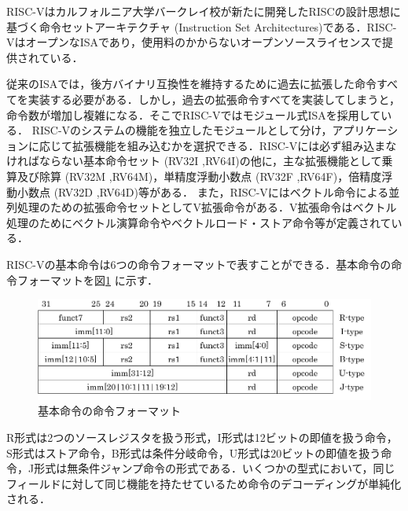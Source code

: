 
RISC-Vはカルフォルニア大学バークレイ校が新たに開発したRISCの設計思想に基づく命令セットアーキテクチャ (Instruction Set Architectures)である．RISC-VはオープンなISAであり，使用料のかからないオープンソースライセンスで提供されている．

従来のISAでは，後方バイナリ互換性を維持するために過去に拡張した命令すべてを実装する必要がある．しかし，過去の拡張命令すべてを実装してしまうと，命令数が増加し複雑になる．そこでRISC-Vではモジュール式ISAを採用している\cite{bib:risc-v-module}．
RISC-Vのシステムの機能を独立したモジュールとして分け，アプリケーションに応じて拡張機能を組み込むかを選択できる．RISC-Vには必ず組み込まなければならない基本命令セット (RV32I ,RV64I)の他に，主な拡張機能として乗算及び除算 (RV32M ,RV64M)，単精度浮動小数点 (RV32F ,RV64F)，倍精度浮動小数点 (RV32D ,RV64D)等がある．
また，RISC-Vにはベクトル命令による並列処理のための拡張命令セットとしてV拡張命令がある．V拡張命令はベクトル処理のためにベクトル演算命令やベクトルロード・ストア命令等が定義されている．

RISC-Vの基本命令は6つの命令フォーマットで表すことができる．基本命令の命令フォーマットを図\ref{fig:RISC-V_Instruction_formats}
に示す．

\begin{figure}
    \centering
    \includegraphics[scale=0.8]{image/Inst_Format.pdf}
    \caption{基本命令の命令フォーマット}
    \label{fig:RISC-V_Instruction_formats}
\end{figure}

R形式は2つのソースレジスタを扱う形式，I形式は12ビットの即値を扱う命令，S形式はストア命令，B形式は条件分岐命令，U形式は20ビットの即値を扱う命令，J形式は無条件ジャンプ命令の形式である．いくつかの型式において，同じフィールドに対して同じ機能を持たせているため命令のデコーディングが単純化される．